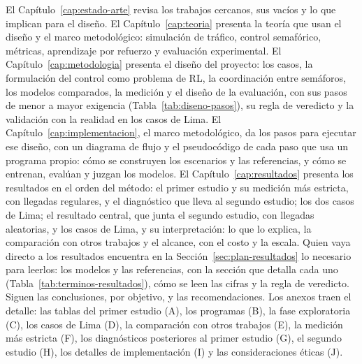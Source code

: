 El Capítulo~\ref{cap:estado-arte} revisa los trabajos cercanos, sus vacíos y lo que implican para el diseño. El Capítulo~\ref{cap:teoria} presenta la teoría que usan el diseño y el marco metodológico: simulación de tráfico, control semafórico, métricas, aprendizaje por refuerzo y evaluación experimental. El Capítulo~\ref{cap:metodologia} presenta el diseño del proyecto: los casos, la formulación del control como problema de RL, la coordinación entre semáforos, los modelos comparados, la medición y el diseño de la evaluación, con sus pasos de menor a mayor exigencia (Tabla~\ref{tab:diseno-pasos}), su regla de veredicto y la validación con la realidad en los casos de Lima. El Capítulo~\ref{cap:implementacion}, el marco metodológico, da los pasos para ejecutar ese diseño, con un diagrama de flujo y el pseudocódigo de cada paso que usa un programa propio: cómo se construyen los escenarios y las referencias, y cómo se entrenan, evalúan y juzgan los modelos. El Capítulo~\ref{cap:resultados} presenta los resultados en el orden del método: el primer estudio y su medición más estricta, con llegadas regulares, y el diagnóstico que lleva al segundo estudio; los dos casos de Lima; el resultado central, que junta el segundo estudio, con llegadas aleatorias, y los casos de Lima, y su interpretación: lo que lo explica, la comparación con otros trabajos y el alcance, con el costo y la escala. Quien vaya directo a los resultados encuentra en la Sección~\ref{sec:plan-resultados} lo necesario para leerlos: los modelos y las referencias, con la sección que detalla cada uno (Tabla~\ref{tab:terminos-resultados}), cómo se leen las cifras y la regla de veredicto. Siguen las conclusiones, por objetivo, y las recomendaciones. Los anexos traen el detalle: las tablas del primer estudio (A), los programas (B), la fase exploratoria (C), los casos de Lima (D), la comparación con otros trabajos (E), la medición más estricta (F), los diagnósticos posteriores al primer estudio (G), el segundo estudio (H), los detalles de implementación (I) y las consideraciones éticas (J).
